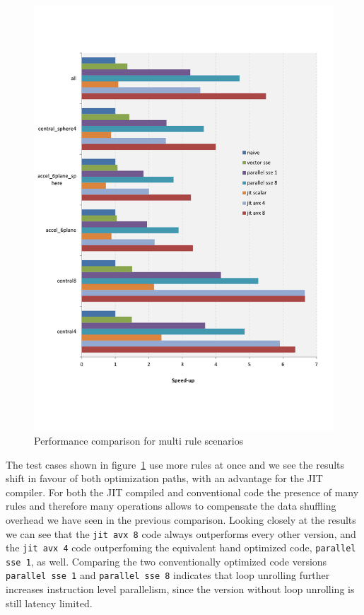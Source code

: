\begin{figure}[th]\centering
  \includegraphics[scale=0.6]{multi_rules.pdf}
  \caption{Performance comparison for multi rule scenarios
  \label{perf_multi}}
\end{figure}

The test cases shown in figure~\ref{perf_multi} use more rules at once and we see the results shift in favour of both optimization paths, with an advantage for the JIT compiler. For both the JIT compiled and conventional code the presence of many rules and therefore many operations allows to compensate the data shuffling overhead we have seen in the previous comparison. Looking closely at the results we can see that the \texttt{jit avx 8} code always outperforms every other version, and the \texttt{jit avx 4} code outperfoming the equivalent hand optimized code, \texttt{parallel sse 1}, as well. Comparing the two conventionally optimized code versions \texttt{parallel sse 1} and \texttt{parallel sse 8} indicates that loop unrolling further increases instruction level parallelism, since the version without loop unrolling is still latency limited.

